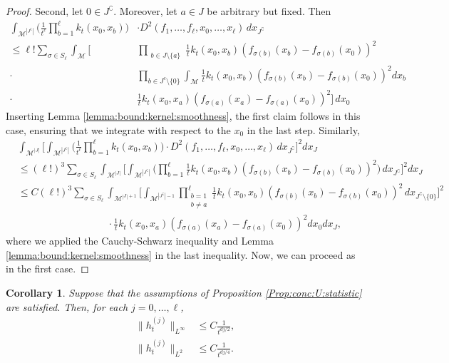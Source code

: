 \documentclass[10pt]{article}
\theoremstyle{plain}
\newtheorem{corollary}{Corollary}
\theoremstyle{definition}
\theoremstyle{remark}
\begin{document}
\begin{proof}
    Second, let $0\in J^\complement$. Moreover, let $a\in J$ be arbitrary but fixed. Then 
    \begin{align*}
        \int_{\mathcal{M}^{|J^\complement|}}
         \Big( \frac{1}{t^\ell}\prod_{b=1}^\ell k_t(x_0,x_b)\Big)&
        \cdot D^2(f_1,\dots,f_\ell,x_0,\dots,x_\ell)\, dx_{J^\complement}
        \\\leq \ell !\sum_{\sigma\in S_\ell}\int_{\mathcal{M}}\Big[&\prod_{\substack{b\in J\setminus\{a\}}}\frac{1}{t} k_t(x_0,x_b) (f_{\sigma(b)}(x_b)-f_{\sigma(b)}(x_0))^2  
        \\\cdot&\prod_{b\in J^c\setminus\{0\}}\int_{\mathcal{M}}\frac{1}{t} k_t(x_0,x_b) (f_{\sigma(b)}(x_b)-f_{\sigma(b)}(x_0))^2dx_b\\
          \cdot & \frac{1}{t} k_t(x_0,x_a) (f_{\sigma(a)}(x_a)-f_{\sigma(a)}(x_0))^2\Big]\,dx_0
    \end{align*}
    Inserting Lemma \ref{lemma:bound:kernel:smoothness}, the first claim follows in this case, ensuring that we integrate with respect to the $x_0$ in the last step. Similarly,
    \begin{align*}
        &\int_{\mathcal{M}^{|J|}}  \Big[ \int_{\mathcal{M}^{|J^\complement|}} \Big( \frac{1}{t^\ell}\prod_{b=1}^\ell k_t(x_0,x_b) \Big) \cdot D^2(f_1,\dots,f_\ell,x_0,\dots,x_\ell)\, dx_{J^\complement} \Big]^2dx_J\\
        & \leq (\ell!)^3 \sum_{\sigma\in S_\ell}\int_{\mathcal{M}^{|J|}} \Big[\int_{\mathcal{M}^{|J^\complement|}} \Big( \prod_{b=1}^\ell\frac{1}{t} k_t(x_0,x_b) (f_{\sigma(b)}(x_b)-f_{\sigma(b)}(x_0))^2\Big) \, dx_{J^\complement}\Big]^2dx_J\\
        & \leq C(\ell!)^3 \sum_{\sigma\in S_\ell} \int_{\mathcal{M}^{|J|+1}}
        \Big[\int_{\mathcal{M}^{|J^\complement|-1}} \prod_{\substack{b=1\\b\neq a}}^\ell\frac{1}{t} k_t(x_0,x_b) (f_{\sigma(b)}(x_b)-f_{\sigma(b)}(x_0))^2\, dx_{J^\complement\setminus\{0\}}\Big]^2\\
        &\qquad \qquad\qquad\qquad\quad   \cdot\frac{1}{t} k_t(x_0,x_a) (f_{\sigma(a)}(x_a)-f_{\sigma(a)}(x_0))^2dx_0dx_J,
    \end{align*} 
where we applied the Cauchy-Schwarz inequality and Lemma \ref{lemma:bound:kernel:smoothness} in the last inequality. Now, we can proceed as in the first case.
\end{proof}

\begin{corollary}\label{corollary:bound:kernel:HD}
    Suppose that the assumptions of Proposition \ref{Prop:conc:U:statistic} are satisfied. Then, for each $j=0,\dots,\ell$, 
    \begin{align*}
        \|h_t^{(j)}\|_{L^\infty}&\leq C\frac{1}{t^{dj/2}},\\
        \|h_t^{(j)}\|_{L^2}&\leq C\frac{1}{t^{dj/4}}.
    \end{align*}
\end{corollary}
\end{document}
